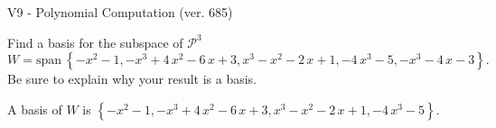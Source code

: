 \begin{exercise}
  \begin{exerciseTitle}V9 - Polynomial Computation (ver. 685)\end{exerciseTitle}
  \begin{exerciseStatement}
    Find a basis for the subspace of \(\mathcal{P}^3\) 
\[W=\mathrm{span}\ \left\{-x^{2} - 1 , -x^{3} + 4 \, x^{2} - 6 \, x + 3 , x^{3} - x^{2} - 2 \, x + 1 , -4 \, x^{3} - 5 , -x^{3} - 4 \, x - 3\right\}.\]
 Be sure to explain why your result is a basis.


  \end{exerciseStatement}
  \begin{exerciseAnswer}
   A basis of \(W\) is  \(\left\{-x^{2} - 1 , -x^{3} + 4 \, x^{2} - 6 \, x + 3 , x^{3} - x^{2} - 2 \, x + 1 , -4 \, x^{3} - 5\right\}\).
  


  \end{exerciseAnswer}
\end{exercise}